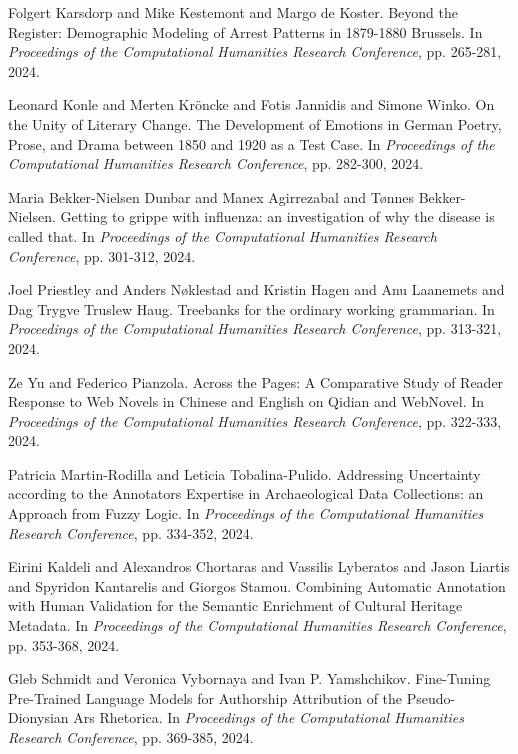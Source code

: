 \begin{thebibliography}{99}
 Folgert Karsdorp and Mike Kestemont and Margo de Koster. {B}eyond the {R}egister: {D}emographic {M}odeling of {A}rrest {P}atterns in 1879-1880 {B}russels. In \textit{Proceedings of the Computational Humanities Research Conference}, pp. 265-281, 2024.

 Leonard Konle and Merten Kr{\"o}ncke and Fotis Jannidis and Simone Winko. {O}n the {U}nity of {L}iterary {C}hange. {T}he {D}evelopment of {E}motions in {G}erman {P}oetry, {P}rose, and {D}rama between 1850 and 1920 as a {T}est {C}ase. In \textit{Proceedings of the Computational Humanities Research Conference}, pp. 282-300, 2024.

 Maria Bekker-Nielsen Dunbar and Manex Agirrezabal and T{\o}nnes Bekker-Nielsen. {G}etting to grippe with influenza: an investigation of why the disease is called that. In \textit{Proceedings of the Computational Humanities Research Conference}, pp. 301-312, 2024.

 Joel Priestley and Anders N{\o}klestad and Kristin Hagen and Anu Laanemets and Dag Trygve Truslew Haug. {T}reebanks for the ordinary working grammarian. In \textit{Proceedings of the Computational Humanities Research Conference}, pp. 313-321, 2024.

 Ze Yu and Federico Pianzola. {A}cross the {P}ages: {A} Comparative {S}tudy of {R}eader {R}esponse to {W}eb {N}ovels in {C}hinese and {E}nglish on {Q}idian and {W}eb{N}ovel. In \textit{Proceedings of the Computational Humanities Research Conference}, pp. 322-333, 2024.

 Patricia Martin-Rodilla and Leticia Tobalina-Pulido. {A}ddressing {U}ncertainty according to the {A}nnotator\textquotesingle s {E}xpertise in {A}rchaeological {D}ata {C}ollections: an {A}pproach from {F}uzzy {L}ogic. In \textit{Proceedings of the Computational Humanities Research Conference}, pp. 334-352, 2024.

 Eirini Kaldeli and Alexandros Chortaras and Vassilis Lyberatos and Jason Liartis and Spyridon Kantarelis and Giorgos Stamou. {C}ombining {A}utomatic {A}nnotation with {H}uman {V}alidation for the {S}emantic {E}nrichment of {C}ultural {H}eritage {M}etadata. In \textit{Proceedings of the Computational Humanities Research Conference}, pp. 353-368, 2024.

 Gleb Schmidt and Veronica Vybornaya and Ivan P. Yamshchikov. {F}ine-{T}uning {P}re-{T}rained {L}anguage {M}odels for {A}uthorship {A}ttribution of the {P}seudo-{D}ionysian {A}rs {R}hetorica. In \textit{Proceedings of the Computational Humanities Research Conference}, pp. 369-385, 2024.


\end{thebibliography}
